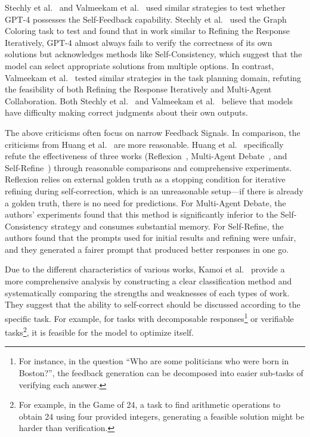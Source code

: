 \documentclass[lettersize,journal]{IEEEtran}
\begin{document}
Stechly et al.~\cite{GPT4Doesnt_23_NeurIPS_ASU} and Valmeekam et al.~\cite{CanSelfCritique_23_NeurIPS_ASU} used similar strategies to test whether GPT-4 possesses the Self-Feedback capability. Stechly et al.~\cite{GPT4Doesnt_23_NeurIPS_ASU} used the Graph Coloring task to test and found that in work similar to Refining the Response Iteratively, GPT-4 almost always fails to verify the correctness of its own solutions but acknowledges methods like Self-Consistency, which suggest that the model can select appropriate solutions from multiple options. In contrast, Valmeekam et al.~\cite{CanSelfCritique_23_NeurIPS_ASU} tested similar strategies in the task planning domain, refuting the feasibility of both Refining the Response Iteratively and Multi-Agent Collaboration. Both Stechly et al.~\cite{GPT4Doesnt_23_NeurIPS_ASU} and Valmeekam et al.~\cite{CanSelfCritique_23_NeurIPS_ASU} believe that models have difficulty making correct judgments about their own outputs.

The above criticisms often focus on narrow Feedback Signals. In comparison, the criticisms from Huang et al.~\cite{TheoryNoReason_24_ICLR_Google} are more reasonable. Huang et al.~\cite{TheoryNoReason_24_ICLR_Google} specifically refute the effectiveness of three works (Reflexion~\cite{Reflexion_23_NeuIPS_Northeastern}, Multi-Agent Debate~\cite{Debate_23_arXiv_MIT}, and Self-Refine~\cite{SelfRefine_23_NeuIPS_CMU}) through reasonable comparisons and comprehensive experiments. Reflexion relies on external golden truth as a stopping condition for iterative refining during self-correction, which is an unreasonable setup---if there is already a golden truth, there is no need for predictions. For Multi-Agent Debate, the authors' experiments found that this method is significantly inferior to the Self-Consistency strategy and consumes substantial memory. For Self-Refine, the authors found that the prompts used for initial results and refining were unfair, and they generated a fairer prompt that produced better responses in one go.

Due to the different characteristics of various works, Kamoi et al.~\cite{SurveySelfCorrection_24_arXiv_PSU} provide a more comprehensive analysis by constructing a clear classification method and systematically comparing the strengths and weaknesses of each types of work. They suggest that the ability to self-correct should be discussed according to the specific task. For example, for tasks with decomposable responses\footnote{For instance, in the question ``Who are some politicians who were born in Boston?'', the feedback generation can be decomposed into easier sub-tasks of verifying each answer.} or verifiable tasks\footnote{For example, in the Game of 24, a task to find arithmetic operations to obtain 24 using four provided integers, generating a feasible solution might be harder than verification.}, it is feasible for the model to optimize itself.
\end{document}
